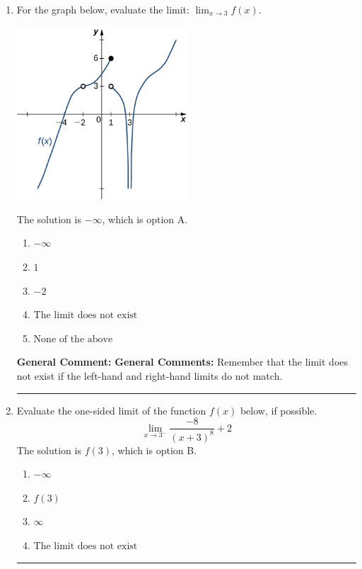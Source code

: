 \documentclass{extbook}[14pt]
\newcommand{\litem}[1]{\item #1

\rule{\textwidth}{0.4pt}}
\begin{document}
\begin{enumerate}\litem{
For the graph below, evaluate the limit: $ \displaystyle \lim_{x \rightarrow 3} f(x)$.

\begin{center}
    \includegraphics[width=0.5\textwidth]{../Figures/evaluateLimitGraphicallyC.png}
\end{center}


The solution is \( -\infty \), which is option A.\begin{enumerate}[label=\Alph*.]
\item \( -\infty \)


\item \( 1 \)


\item \( -2 \)


\item \( \text{The limit does not exist} \)


\item \( \text{None of the above} \)


\end{enumerate}

\textbf{General Comment:} \textbf{General Comments:} Remember that the limit does not exist if the left-hand and right-hand limits do not match.
}
\litem{
Evaluate the one-sided limit of the function $f(x)$ below, if possible.
\[ \lim_{x \rightarrow 3^-} \frac{-8}{(x+3)^8}+2 \]The solution is \( f(3) \), which is option B.\begin{enumerate}[label=\Alph*.]
\item \( -\infty \)


\item \( f(3) \)


\item \( \infty \)


\item \( \text{The limit does not exist} \)



\end{enumerate}}
\end{enumerate}
\end{document}
